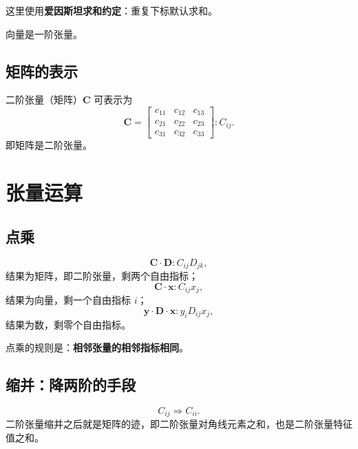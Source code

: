 \begin{keybox}[爱因斯坦求和约定]
	这里使用\textbf{爱因斯坦求和约定}：重复下标默认求和。
\end{keybox}

向量是一阶张量。

\subsection{矩阵的表示}

二阶张量（矩阵）$\boldsymbol{C}$ 可表示为
\begin{equation}
	\boldsymbol{C}=
	\begin{bmatrix}
		c_{11} & c_{12} & c_{13} \\
		c_{21} & c_{22} & c_{23} \\
		c_{31} & c_{32} & c_{33}
	\end{bmatrix}:C_{ij}.
	\label{eq:二阶张量指标表示}
\end{equation}
即矩阵是二阶张量。

\section{张量运算}

\subsection{点乘}

\begin{equation}
	\boldsymbol{C}\cdot\boldsymbol{D}:C_{ij}D_{jk},
	\label{eq:张量点乘}
\end{equation}
结果为矩阵，即二阶张量，剩两个自由指标；
\begin{equation}
	\boldsymbol{C}\cdot\boldsymbol{x}:C_{ij}x_{j},
	\label{eq:张量与向量点乘}
\end{equation}
结果为向量，剩一个自由指标 $i$；
\begin{equation}
	\boldsymbol{y}\cdot\boldsymbol{D}\cdot\boldsymbol{x}:y_{i}D_{ij}x_{j},
	\label{eq:向量夹乘}
\end{equation}
结果为数，剩零个自由指标。

点乘的规则是：\textbf{相邻张量的相邻指标相同}。

\subsection{缩并：降两阶的手段}

\begin{equation}
	C_{ij}\Rightarrow C_{ii}.
	\label{eq:张量缩并}
\end{equation}
二阶张量缩并之后就是矩阵的迹，即二阶张量对角线元素之和，也是二阶张量特征值之和。

